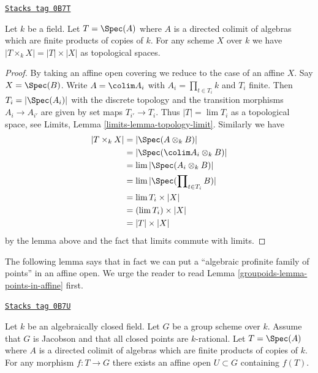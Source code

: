 \begin{lemma}
\label{groupoids-lemma-profinite-product-over-field}
\href{https://stacks.math.columbia.edu/tag/0B7T}{\texttt{Stacks tag 0B7T}}

Let $k$ be a field. Let $T = \Spec(A)$ where $A$ is a directed colimit of
algebras which are finite products of copies of $k$. For any scheme $X$
over $k$ we have $|T \times_k X| = |T| \times |X|$ as topological spaces.
\end{lemma}

\begin{proof}
By taking an affine open covering we reduce to the case of an affine $X$.
Say $X = \Spec(B)$.
Write $A = \colim A_i$ with $A_i = \prod_{t \in T_i} k$ and $T_i$ finite.
Then $T_i = |\Spec(A_i)|$ with the discrete topology and the transition
morphisms $A_i \to A_{i'}$ are given by set maps $T_{i'} \to T_i$. Thus
$|T| = \lim T_i$ as a topological space, see
Limits, Lemma \ref{limits-lemma-topology-limit}. Similarly we have
\begin{align*}
|T \times_k X| & =
|\Spec(A \otimes_k B)| \\
& =
|\Spec(\colim A_i \otimes_k B)| \\
& =
\lim |\Spec(A_i \otimes_k B)| \\
& =
\lim |\Spec(\prod\nolimits_{t \in T_i} B)| \\
& =
\lim T_i \times |X| \\
& =
(\lim T_i) \times |X| \\
& =
|T| \times |X|
\end{align*}
by the lemma above and the fact that limits commute with limits.
\end{proof}

The following lemma says that in fact we can put a
``algebraic profinite family of points'' in an affine open.
We urge the reader to read Lemma \ref{groupoids-lemma-points-in-affine} first.

\begin{lemma}
\label{groupoids-lemma-compact-set-in-affine}
\href{https://stacks.math.columbia.edu/tag/0B7U}{\texttt{Stacks tag 0B7U}}

Let $k$ be an algebraically closed field. Let $G$ be a group scheme over $k$.
Assume that $G$ is Jacobson and that all closed points are $k$-rational.
Let $T = \Spec(A)$ where $A$ is a directed colimit of algebras which
are finite products of copies of $k$. For any morphism $f : T \to G$
there exists an affine open $U \subset G$ containing $f(T)$.
\end{lemma}

